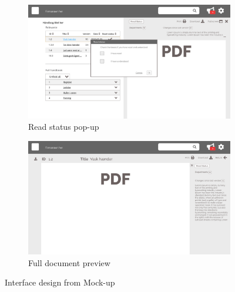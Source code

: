 \begin{figure}[H]\ContinuedFloat
	\centering
	\begin{subfigure}[b]{0.48\textwidth}
		\includegraphics[width=\textwidth]{billeder/iteration2Prototyper/Page_5.jpg}
		\caption{Read status pop-up}
		\label{fig:4-Read}
	\end{subfigure}
	\quad
	\begin{subfigure}[b]{0.48\textwidth}
		\includegraphics[width=\textwidth]{billeder/iteration2Prototyper/Page_6.jpg}
		\caption{Full document preview}
		\label{fig:4-DocPrevieFull}
	\end{subfigure}
	\caption{Interface design from Mock-up}\label{fig:4-MockUp}
\end{figure}

\newpage
